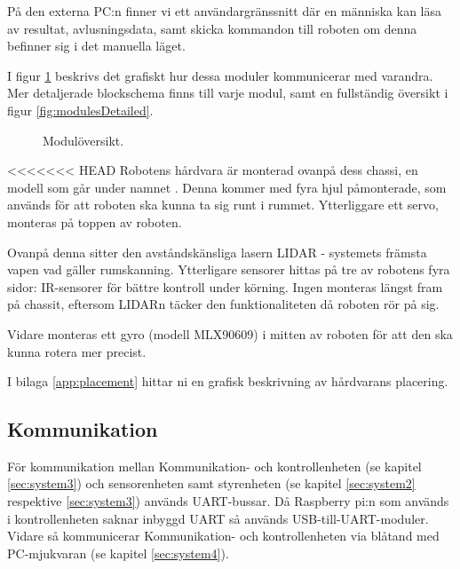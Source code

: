 \documentclass[a4paper,11pt]{article}
\begin{document}
På den externa PC:n finner vi ett användargränssnitt där en människa kan läsa av resultat, avlusningsdata, samt skicka kommandon till roboten om denna befinner sig i det manuella läget.

I figur \ref{fig:modules} beskrivs det grafiskt hur dessa moduler kommunicerar med varandra. Mer detaljerade blockschema finns till varje modul, samt en fullständig översikt i figur \ref{fig:modulesDetailed}.

\begin{figure}
    \caption{Modulöversikt.}
    \label{fig:modules}
\end{figure}

<<<<<<< HEAD
\noindent
Robotens hårdvara är monterad ovanpå dess chassi, en modell som går under namnet \cite{terminator}. Denna kommer med fyra hjul påmonterade, som används för att roboten ska kunna ta sig runt i rummet. Ytterliggare ett servo, monteras på toppen av roboten.

Ovanpå denna sitter den avståndskänsliga lasern LIDAR - systemets främsta vapen vad gäller rumskanning. Ytterligare sensorer hittas på tre av robotens fyra sidor: IR-sensorer för bättre kontroll under körning. Ingen monteras längst fram på chassit, eftersom LIDARn täcker den funktionaliteten då roboten rör på sig.

Vidare monteras ett gyro (modell MLX90609) i mitten av roboten för att den ska kunna rotera mer precist.

I bilaga \ref{app:placement} hittar ni en grafisk beskrivning av hårdvarans placering.

\subsection{Kommunikation}
För kommunikation mellan Kommunikation- och kontrollenheten (se kapitel \ref{sec:system3}) och sensorenheten samt styrenheten (se kapitel \ref{sec:system2} respektive \ref{sec:system3}) används UART-bussar. Då Raspberry pi:n som används i kontrollenheten saknar inbyggd UART så används USB-till-UART-moduler. Vidare så kommunicerar Kommunikation- och kontrollenheten via blåtand med PC-mjukvaran (se kapitel \ref{sec:system4}).
\end{document}
